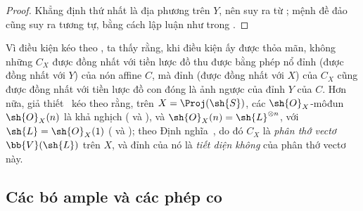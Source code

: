 \documentclass[oneside,10pt]{amsart}
\let\EGAOriginalLabel\label
\renewcommand{\label}[1]{\phantomsection\EGAOriginalLabel{#1}}
\begin{document}
\begin{proof}
Khẳng định thứ nhất là địa phương trên $Y$, nên suy ra từ ;
mệnh đề đảo cũng suy ra tương tự, bằng cách lập luận như trong .
\end{proof}
\begin{remark}[8.7.8]
\label{II.8.7.8}
Vì điều kiện  kéo theo , ta thấy rằng, khi điều kiện ấy được thỏa mãn, không những $C_X$ được đồng nhất với tiền lược đồ thu được bằng phép nổ đỉnh (được đồng nhất với $Y$) của nón affine $C$, mà đỉnh (được đồng nhất với $X$) của $C_X$ cũng được đồng nhất với tiền lược đồ con đóng là ảnh ngược của đỉnh $Y$ của $C$.
Hơn nữa, giả thiết~ kéo theo rằng, trên $X=\Proj(\sh{S})$, các $\sh{O}_X$-môđun $\sh{O}_X(n)$ là khả nghịch ( và ), và $\sh{O}_X(n)=\sh{L}^{\otimes n}$, với $\sh{L}=\sh{O}_X(1)$ ( và );
theo Định nghĩa~, do đó $C_X$ là \emph{phân thớ vectơ} $\bb{V}(\sh{L})$ trên $X$, và đỉnh của nó là \emph{tiết diện không} của phân thớ vectơ này.
\end{remark}
\subsection{Các bó ample và các phép co}
\label{subsection:II.8.8}
\end{document}
